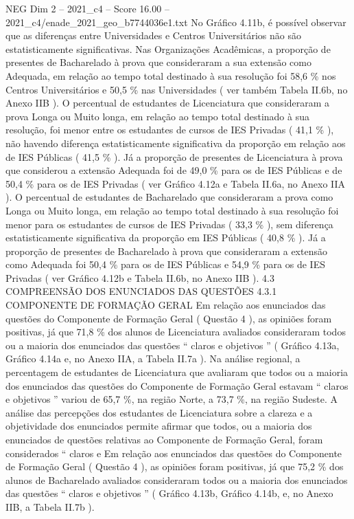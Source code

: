 \begin{textsample}{NEG Dim 2 – 2021\_c4 – Score 16.00 – 2021\_c4/enade\_2021\_geo\_b7744036e1.txt}
No Gráfico 4.11b, é possível observar que as diferenças entre Universidades e Centros Universitários não são estatisticamente significativas.
Nas Organizações Acadêmicas, a proporção de presentes de Bacharelado à prova que consideraram a sua extensão como Adequada, em relação ao tempo total destinado à sua resolução foi 58,6 \% nos Centros Universitários e 50,5 \% nas Universidades ( ver também Tabela II.6b, no Anexo IIB ).
O percentual de estudantes de Licenciatura que consideraram a prova Longa ou Muito longa, em relação ao tempo total destinado à sua resolução, foi menor entre os estudantes de cursos de IES Privadas ( 41,1 \% ), não havendo diferença estatisticamente significativa da proporção em relação aos de IES Públicas ( 41,5 \% ).
Já a proporção de presentes de Licenciatura à prova que considerou a extensão Adequada foi de 49,0 \% para os de IES Públicas e de 50,4 \% para os de IES Privadas ( ver Gráfico 4.12a e Tabela II.6a, no Anexo IIA ).
O percentual de estudantes de Bacharelado que consideraram a prova como Longa ou Muito longa, em relação ao tempo total destinado à sua resolução foi menor para os estudantes de cursos de IES Privadas ( 33,3 \% ), sem diferença estatisticamente significativa da proporção em IES Públicas ( 40,8 \% ).
Já a proporção de presentes de Bacharelado à prova que consideraram a extensão como Adequada foi 50,4 \% para os de IES Públicas e 54,9 \% para os de IES Privadas ( ver Gráfico 4.12b e Tabela II.6b, no Anexo IIB ). 4.3 COMPREENSÃO DOS ENUNCIADOS DAS QUESTÕES 4.3.1 COMPONENTE DE FORMAÇÃO GERAL Em relação aos enunciados das questões do Componente de Formação Geral ( Questão 4 ), as opiniões foram positivas, já que 71,8 \% dos alunos de Licenciatura avaliados consideraram todos ou a maioria dos enunciados das questões “ claros e objetivos ” ( Gráfico 4.13a, Gráfico 4.14a e, no Anexo IIA, a Tabela II.7a ).
Na análise regional, a percentagem de estudantes de Licenciatura que avaliaram que todos ou a maioria dos enunciados das questões do Componente de Formação Geral estavam “ claros e objetivos ” variou de 65,7 \%, na região Norte, a 73,7 \%, na região Sudeste.
A análise das percepções dos estudantes de Licenciatura sobre a clareza e a objetividade dos enunciados permite afirmar que todos, ou a maioria dos enunciados de questões relativas ao Componente de Formação Geral, foram considerados “ claros e Em relação aos enunciados das questões do Componente de Formação Geral ( Questão 4 ), as opiniões foram positivas, já que 75,2 \% dos alunos de Bacharelado avaliados consideraram todos ou a maioria dos enunciados das questões “ claros e objetivos ” ( Gráfico 4.13b, Gráfico 4.14b, e, no Anexo IIB, a Tabela II.7b ).

\end{textsample}
